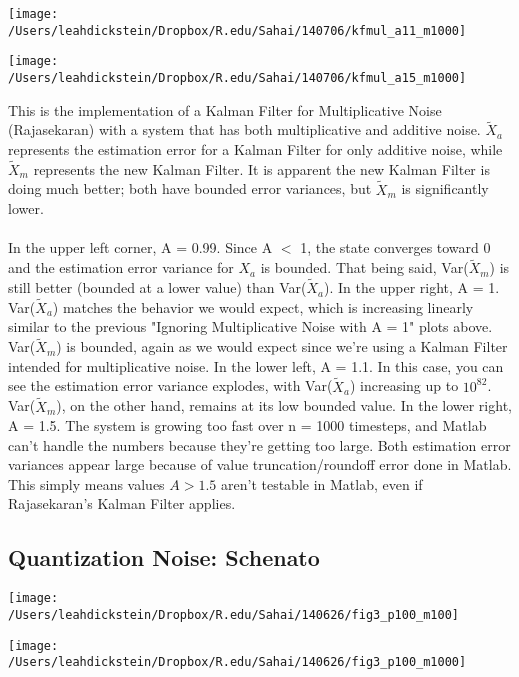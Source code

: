 \documentclass[leqno,twocolumn]{article}
\begin{document}
\begin{minipage}[c]{0.5\textwidth}
\texttt{[image: /Users/leahdickstein/Dropbox/R.edu/Sahai/140706/kfmul\_a11\_m1000]}
\end{minipage}
\begin{minipage}[c]{0.5\textwidth}
\texttt{[image: /Users/leahdickstein/Dropbox/R.edu/Sahai/140706/kfmul\_a15\_m1000]}
\end{minipage}

This is the implementation of a Kalman Filter for Multiplicative Noise (Rajasekaran) with a system that has both multiplicative and additive noise. $\tilde{X}_a$ represents the estimation error for a Kalman Filter for only additive noise, while $\tilde{X}_m$ represents the new Kalman Filter. It is apparent the new Kalman Filter is doing much better; both have bounded error variances, but $\tilde{X}_m$ is significantly lower.\\\\
In the upper left corner, A = 0.99. Since A $<$ 1, the state converges toward 0 and the estimation error variance for $X_a$ is bounded. That being said, Var($\tilde{X}_m$) is still better (bounded at a lower value) than Var($\tilde{X}_a$). In the upper right, A = 1. Var($\tilde{X}_a$) matches the behavior we would expect, which is increasing linearly similar to the previous "Ignoring Multiplicative Noise with A = 1" plots above. Var($\tilde{X}_m$) is bounded, again as we would expect since we're using a Kalman Filter intended for multiplicative noise. In the lower left, A = 1.1. In this case, you can see the estimation error variance explodes, with Var($\tilde{X}_a$) increasing up to $10^82$. Var($\tilde{X}_m$), on the other hand, remains at its low bounded value. In the lower right, A = 1.5. The system is growing too fast over n = 1000 timesteps, and Matlab can't handle the numbers because they're getting too large. Both estimation error variances appear large because of value truncation/roundoff error done in Matlab. This simply means values $A > 1.5$ aren't testable in Matlab, even if Rajasekaran's Kalman Filter applies.

\subsection{Quantization Noise: Schenato}
\begin{minipage}[c]{0.5\textwidth}
\texttt{[image: /Users/leahdickstein/Dropbox/R.edu/Sahai/140626/fig3\_p100\_m100]}
\end{minipage}
\begin{minipage}[c]{0.5\textwidth}
\texttt{[image: /Users/leahdickstein/Dropbox/R.edu/Sahai/140626/fig3\_p100\_m1000]}
\end{minipage}
\end{document}
